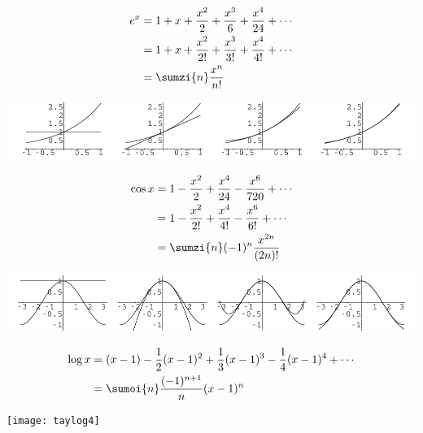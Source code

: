 \documentclass{book}
\begin{document}
\begin{align*}
e^x 
	&= 1 + x + \frac{x^2}{2} + \frac{x^3}{6} + \frac{x^4}{24} + \cdots \\
	&= 1 + x + \frac{x^2}{2!} + \frac{x^3}{3!} + \frac{x^4}{4!} + \cdots \\
	&= \sumzi{n} \frac{x^n}{n!}
\end{align*}

\begin{center}
\includegraphics{tayexp4}
\end{center}



\begin{align*}
\cos x
	&= 1 - \frac{x^2}{2} + \frac{x^4}{24} - \frac{x^6}{720} + \cdots \\
	&= 1 - \frac{x^2}{2!} + \frac{x^4}{4!} - \frac{x^6}{6!} + \cdots \\
	&= \sumzi{n} (-1)^n \frac{x^{2n}}{(2n)!}
\end{align*}

\begin{center}
\includegraphics{taycos4}
\end{center}


\begin{align*}
\log x
	&= (x-1) - \frac{1}{2} (x-1)^2 + \frac{1}{3} (x-1)^3 - \frac{1}{4}
		(x-1)^4 + \cdots \\
	&= \sumoi{n} \frac{(-1)^{n+1} }{n} (x-1)^n
\end{align*}


\begin{center}
\texttt{[image: taylog4]}
\end{center}
\end{document}
